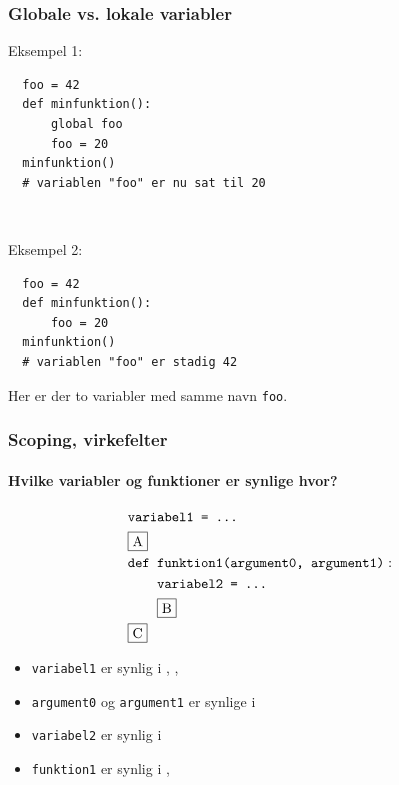 \documentclass[10pt]{beamer}
\begin{document}
\begin{frame}[fragile]
  \frametitle{Globale vs. lokale variabler}
Eksempel 1:
\begin{verbatim}
  foo = 42
  def minfunktion():
      global foo
      foo = 20
  minfunktion()
  # variablen "foo" er nu sat til 20
\end{verbatim}

~

\noindent
Eksempel 2:
\begin{verbatim}
  foo = 42
  def minfunktion():
      foo = 20
  minfunktion()
  # variablen "foo" er stadig 42
\end{verbatim}
Her er der to variabler med samme navn \texttt{foo}.

\end{frame}



\begin{frame}
  \frametitle{Scoping, virkefelter}
  \framesubtitle{Hvilke variabler og funktioner er synlige hvor?}

  \begin{align*}
    &\texttt{variabel1 = ...} \\
    &\fbox{A} \\
    &\texttt{def~}\texttt{funktion1(argument0, argument1)}: \\
    &\texttt{~~~~}\texttt{variabel2 = ...} \\
    &\texttt{~~~~}\fbox{B} \\
    &\fbox{C}
  \end{align*}

  \begin{itemize}
  \item \texttt{variabel1} er synlig i , , 
  \item \texttt{argument0} og \texttt{argument1} er synlige i 
  \item \texttt{variabel2} er synlig i 
  \item \texttt{funktion1} er synlig i , 
  \end{itemize}
  
\end{frame}
\end{document}
